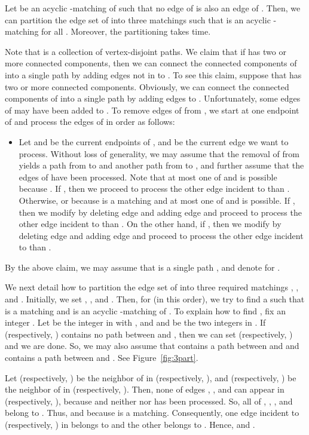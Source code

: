\documentclass[11pt,twoside]{article}\usepackage{amssymb,latexsym,graphicx,hyperref}\usepackage{epstopdf}
\newenvironment{proof}{{\sc Proof. }}{\hfill\vspace{0.2in}}
\begin{document}
\begin{lemma}\label{lem:mine}
Let  be an acyclic -matching of  such that no edge of  is also an edge of .
Then, we can partition the edge set of  into three matchings 
such that  is an acyclic -matching for all .
Moreover, the partitioning takes  time. 
\end{lemma}
\begin{proof}
Note that  is a collection of vertex-disjoint paths.
We claim that if  has two or more connected components,
then we can connect the connected components of  into a single path by adding edges not in  to .
To see this claim, suppose that  has two or more connected components.
Obviously, we can connect the connected components of  into a single path by adding edges to . 
Unfortunately, some edges of  may have been added to . 
To remove edges of  from , we start at one endpoint of  and process the edges of  in order as follows: 
\begin{itemize}
\item
	Let  and  be the current endpoints of , and  be the current edge we want to process.
	Without loss of generality, we may assume that the removal of  from  yields a path  from  to 
	and another path  from  to , and further assume that the edges of  have been processed.
	Note that at most one of  and  is possible because .
	If , then we proceed to process the other edge incident to  than .
	Otherwise,  or  because  is a matching and at most one of  and  is possible.
	If , then we modify  by deleting edge  and adding edge  and
	proceed to process the other edge incident to  than .
	On the other hand, if , then we modify  by deleting edge  and adding edge  and
	proceed to process the other edge incident to  than . 
\end{itemize}

By the above claim, we may assume that  is a single path ,
and denote  for . 


We next detail how to partition the edge set of  into three required matchings , , and .
Initially, we set , , and .
Then, for  (in this order), we try to find a  such that
 is a matching and  is an acyclic -matching of . 
To explain how to find , fix an integer . 
Let  be the integer in  with , and  and  be the two integers in . 
If  (respectively, ) contains no path between  and ,
then we can set  (respectively, ) and we are done.
So, we may also assume that  contains a path  between  and  and
 contains a path  between  and .
See Figure~\ref{fig:3part}. 

Let  (respectively, ) be the neighbor of  in  (respectively, ),
and  (respectively, ) be the neighbor of  in  (respectively, ).
Then, none of edges , , and  can appear in  (respectively, ),
because  and neither  nor  has been processed.
So, all of , , , and  belong to .
Thus,  and  because  is a matching.
Consequently, one edge incident to  (respectively, ) in  belongs to  and the other belongs to .
Hence,  and . 


\end{proof}
\end{document}

